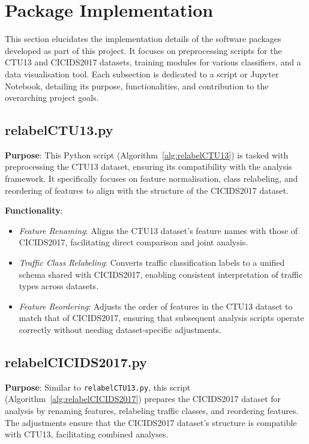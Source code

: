 \section{Package Implementation}
This section elucidates the implementation details of the software packages developed as part of this project. It focuses on preprocessing scripts for the CTU13 and CICIDS2017 datasets, training modules for various classifiers, and a data visualisation tool. Each subsection is dedicated to a script or Jupyter Notebook, detailing its purpose, functionalities, and contribution to the overarching project goals.

\subsection{relabelCTU13.py}
\textbf{Purpose}: This Python script (Algorithm~\ref{alg:relabelCTU13}) is tasked with preprocessing the CTU13 dataset, ensuring its compatibility with the analysis framework. It specifically focuses on feature normalisation, class relabeling, and reordering of features to align with the structure of the CICIDS2017 dataset.

\textbf{Functionality}:
\begin{itemize}
    \item \textit{Feature Renaming}: Aligns the CTU13 dataset's feature names with those of CICIDS2017, facilitating direct comparison and joint analysis.
    \item \textit{Traffic Class Relabeling}: Converts traffic classification labels to a unified schema shared with CICIDS2017, enabling consistent interpretation of traffic types across datasets.
    \item \textit{Feature Reordering}: Adjusts the order of features in the CTU13 dataset to match that of CICIDS2017, ensuring that subsequent analysis scripts operate correctly without needing dataset-specific adjustments.
\end{itemize}

\subsection{relabelCICIDS2017.py}
\textbf{Purpose}: Similar to \texttt{relabelCTU13.py}, this script (Algorithm~\ref{alg:relabelCICIDS2017}) prepares the CICIDS2017 dataset for analysis by renaming features, relabeling traffic classes, and reordering features. The adjustments ensure that the CICIDS2017 dataset's structure is compatible with CTU13, facilitating combined analyses.

